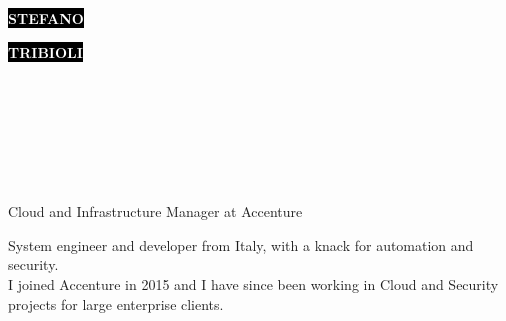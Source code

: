 \documentclass[9pt]{developercv}
\begin{document}
\begin{minipage}[t]{0.42\textwidth}
	\vspace{-\baselineskip}
	
	\colorbox{black}{{\HUGE\textcolor{white}{\textbf{\MakeUppercase{Stefano}}}}}
	
	\colorbox{black}{{\HUGE\textcolor{white}{\textbf{\MakeUppercase{Tribioli}}}}}
\end{minipage}
\begin{minipage}[t]{0.29\textwidth}
	\vspace{-\baselineskip}
	
	\\
	\\	
\end{minipage}
\begin{minipage}[t]{0.29\textwidth}
	\vspace{-\baselineskip}
	
	\\
	\\
	\\
\end{minipage}

\begin{minipage}[t]{1\textwidth}
\vspace{6pt}
\LARGE Cloud and Infrastructure Manager at Accenture
\end{minipage}


\begin{minipage}[t]{1\textwidth}
	\vspace{-\baselineskip}
	System engineer and developer from Italy, with a knack for automation and security.
	\\
	I joined Accenture in 2015 and I have since been working in Cloud and Security projects for large enterprise clients.
\end{minipage}

\end{document}
